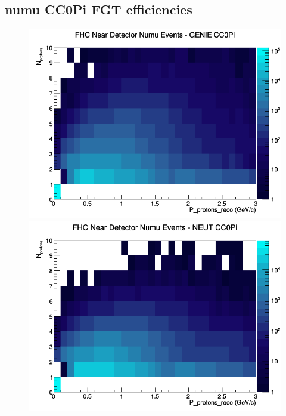 \subsection{numu CC0Pi FGT efficiencies}
\begin{figure}[h]
\includegraphics[width=\linewidth]{eff_N_P/FGT/protons/CC0Pi_FHC_ND_numu_N_P_GENIE.png}
\endminipage
{}
\includegraphics[width=\linewidth]{eff_N_P/FGT/protons/CC0Pi_FHC_ND_numu_N_P_NEUT.png}
\endminipage
{}

\end{figure}
